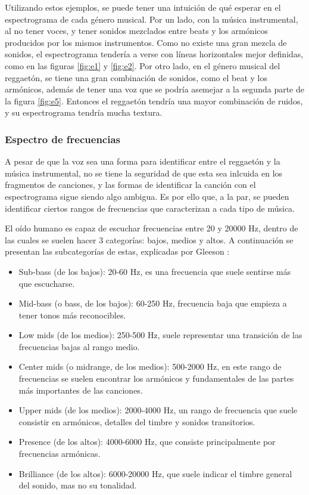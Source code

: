 \documentclass[12pt, letterpaper]{article}
\begin{document}
\noindent Utilizando estos ejemplos, se puede tener una intuición de qué esperar
en el espectrograma de cada género musical. Por un lado, con la música instrumental,
al no tener voces, y tener sonidos mezclados entre beats y los armónicos producidos
por los mismos instrumentos. Como no existe una gran mezcla de sonidos, el espectrograma
tendería a verse con líneas horizontales mejor definidas, como en las figuras
\ref{fig:e1} y \ref{fig:e2}. Por otro lado, en el género musical del reggaetón, se tiene
una gran combinación de sonidos, como el beat y los armónicos, además de tener una voz
que se podría asemejar a la segunda parte de la figura \ref{fig:e5}. Entonces el reggaetón
tendría una mayor combinación de ruidos, y su espectrograma tendría mucha textura.

\subsubsection{Espectro de frecuencias}

A pesar de que la voz sea una forma para identificar entre el reggaetón y la música
instrumental, no se tiene la seguridad de que esta sea inlcuida en los fragmentos
de canciones, y las formas de identificar la canción con el espectrograma sigue siendo
algo ambigua. Es por ello que, a la par, se pueden identificar ciertos rangos de frecuencias
que caracterizan a cada tipo de música.

El oído humano es capaz de escuchar frecuencias entre 20 y 20000 Hz, dentro de las
cuales se suelen hacer 3 categorías: bajos, medios y altos. A continuación se
presentan las subcategorías de estas, explicadas por Gleeson \cite{Gleeson-2024}:

\begin{itemize}
  \item Sub-bass (de los bajos): 20-60 Hz, es una frecuencia que suele sentirse más
  que escucharse.
  \item Mid-bass (o bass, de los bajos): 60-250 Hz, frecuencia baja que empieza a tener tonos más
  reconocibles.
  \item Low mids (de los medios): 250-500 Hz, suele representar una transición de las frecuencias
  bajas al rango medio.
  \item Center mids (o midrange, de los medios): 500-2000 Hz, en este rango de frecuencias
  se suelen encontrar los armónicos y fundamentales de las partes más importantes de las
  canciones.
  \item Upper mids (de los medios): 2000-4000 Hz, un rango de frecuencia que suele consistir en
  armónicos, detalles del timbre y sonidos transitorios.
  \item Presence (de los altos): 4000-6000 Hz, que consiste principalmente por frecuencias
  armónicas.
  \item Brilliance (de los altos): 6000-20000 Hz, que suele indicar el timbre general del sonido,
  mas no su tonalidad.
\end{itemize}
\end{document}
